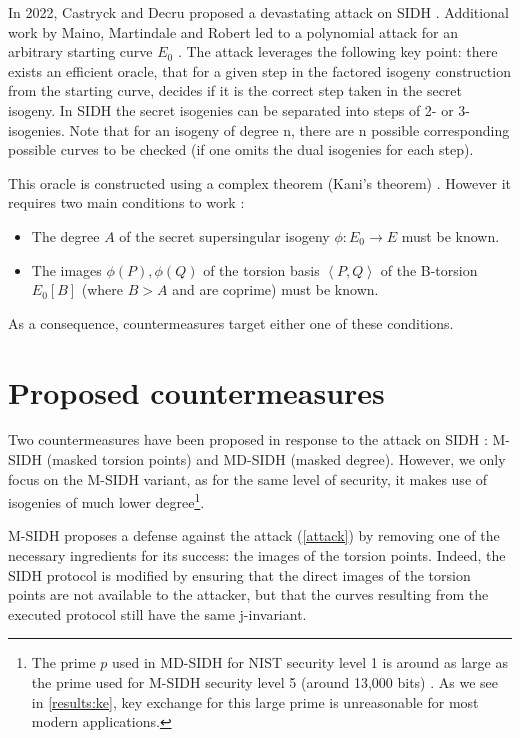 \documentclass[a4paper,11pt,oneside]{report}
\begin{document}
    In 2022, Castryck and Decru proposed a devastating attack on SIDH \cite{attack}. Additional work by Maino, Martindale and Robert led to a polynomial attack for an arbitrary starting curve $E_0$ \cite{robert}. The attack leverages the following key point: there exists an efficient oracle, that for a given step in the factored isogeny construction from the starting curve, decides if it is the correct step taken in the secret isogeny. In SIDH the secret isogenies can be separated into steps of 2- or 3-isogenies. Note that for an isogeny of degree n, there are n possible corresponding possible curves to be checked (if one omits the dual isogenies for each step).
    
    This oracle is constructed using a complex theorem (Kani's theorem) \cite{attack}. However it requires two main conditions to work \cite{msidh}:
    \begin{itemize}
        \item The degree $A$ of the secret supersingular isogeny $\phi : E_0\rightarrow E$ must be known.
        \item The images $\phi (P), \phi (Q)$ of the torsion basis $\left \langle P, Q \right \rangle$ of the B-torsion $E_0 [B]$ (where $B > A$ and are coprime) must be known.
    \end{itemize}
    
    As a consequence, countermeasures target either one of these conditions.

\section{Proposed countermeasures}

    Two countermeasures have been proposed in response to the attack on SIDH \cite{msidh}: M-SIDH (masked torsion points) and MD-SIDH (masked degree). However, we only focus on the M-SIDH variant, as for the same level of security, it makes use of isogenies of much lower degree\footnote{The prime $p$ used in MD-SIDH for NIST security level 1 is around as large as the prime used for M-SIDH security level 5 (around 13,000 bits) \cite{msidh}. As we see in \autoref{results:ke}, key exchange for this large prime is unreasonable for most modern applications.}. 

    M-SIDH proposes a defense against the attack (\autoref{attack}) by removing one of the necessary ingredients for its success: the images of the torsion points. Indeed, the SIDH protocol is modified by ensuring that the direct images of the torsion points are not available to the attacker, but that the curves resulting from the executed protocol still have the same j-invariant.
\end{document}

